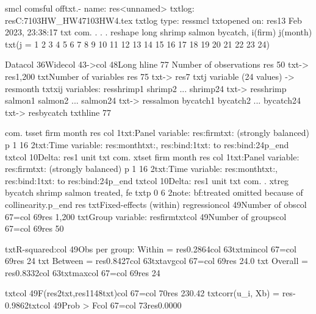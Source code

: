 {smcl}
{com}{sf}{ul off}{txt}{.-}
      name:  {res}<unnamed>
       {txt}log:  {res}C:\Users\sedat\OneDrive{}\ECON7103HW_HW4\Econ7103HW4.tex
  {txt}log type:  {res}smcl
 {txt}opened on:  {res}13 Feb 2023, 23:38:17
{txt}
{com}. 
. 
. 
. reshape long shrimp salmon bycatch, i(firm) j(month)
{txt}(j = 1 2 3 4 5 6 7 8 9 10 11 12 13 14 15 16 17 18 19 20 21 22 23 24)

Data{col 36}Wide{col 43}->{col 48}Long
{hline 77}
Number of observations     {res}          50   {txt}->   {res}1,200       
{txt}Number of variables        {res}          75   {txt}->   {res}7           
{txt}j variable (24 values)                    ->   {res}month
{txt}xij variables:
           {res}shrimp1 shrimp2 ... shrimp24   {txt}->   {res}shrimp
           salmon1 salmon2 ... salmon24   {txt}->   {res}salmon
        bycatch1 bycatch2 ... bycatch24   {txt}->   {res}bycatch
{txt}{hline 77}

{com}. tsset firm month
{res}
{col 1}{txt:Panel variable: }{res:firm}{txt: (strongly balanced)}
{p 1 16 2}{txt:Time variable: }{res:month}{txt:, }{res:{bind:1}}{txt: to }{res:{bind:24}}{p_end}
{txt}{col 10}Delta: {res}1 unit
{txt}
{com}. xtset firm month
{res}
{col 1}{txt:Panel variable: }{res:firm}{txt: (strongly balanced)}
{p 1 16 2}{txt:Time variable: }{res:month}{txt:, }{res:{bind:1}}{txt: to }{res:{bind:24}}{p_end}
{txt}{col 10}Delta: {res}1 unit
{txt}
{com}. 
. xtreg bycatch shrimp salmon treated, fe
{txt}{p 0 6 2}note: {bf:treated} omitted because of collinearity.{p_end}
{res}
{txt}Fixed-effects (within) regression{col 49}Number of obs{col 67}={col 69}{res}     1,200
{txt}Group variable: {res}firm{txt}{col 49}Number of groups{col 67}={col 69}{res}        50

{txt}R-squared:{col 49}Obs per group:
     Within  = {res}0.2864{col 63}{txt}min{col 67}={col 69}{res}        24
{txt}     Between = {res}0.8427{col 63}{txt}avg{col 67}={col 69}{res}      24.0
{txt}     Overall = {res}0.8332{col 63}{txt}max{col 67}={col 69}{res}        24

{txt}{col 49}F({res}2{txt},{res}1148{txt}){col 67}={col 70}{res}   230.42
{txt}corr(u_i, Xb) = {res}-0.9862{txt}{col 49}Prob > F{col 67}={col 73}{res}0.0000

